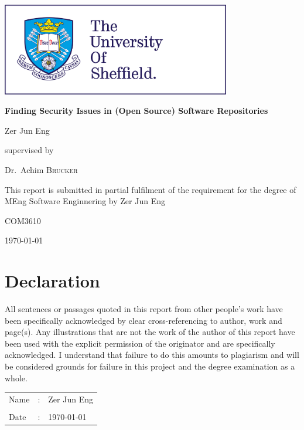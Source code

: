 \documentclass[12pt, a4paper]{report}
\begin{document}
\begin{titlepage}
	\centering
	\includegraphics[width=10cm]{images/tuos_logo}\par\vspace{1cm}
	\vspace{1cm}

	{\huge\bfseries Finding Security Issues in (Open Source) Software Repositories\par}
	\vspace{1cm}

	{\Large Zer Jun Eng\par}
	\vspace{1cm}

	supervised by\par Dr.~Achim \textsc{Brucker}
	\vfill

	{This report is submitted in partial fulfilment of the requirement for the degree of MEng Software
		Enginnering by Zer Jun Eng}
	\vfill

	{\large COM3610}
	\vfill

	{\large \today}
\end{titlepage}


\chapter*{Declaration}
All sentences or passages quoted in this report from other people's work have been specifically
acknowledged by clear cross-referencing to author, work and page(s). Any illustrations that are not
the work of the author of this report have been used with the explicit permission of the originator
and are specifically acknowledged. I understand that failure to do this amounts to plagiarism and
will be considered grounds for failure in this project and the degree examination as a whole.
\vspace{2cm}

\noindent \begin{tabular}{llp{4.5cm}}
	Name & : & Zer Jun Eng \\ \cline{3-3}
	\\ [-0.5em]
	Date & : & \today      \\ \cline{3-3}
\end{tabular}
\end{document}
